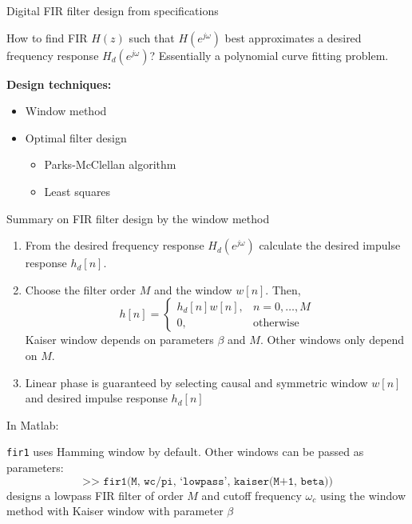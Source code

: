 \documentclass[10pt]{beamer}
\begin{document}
%
\begin{frame}{Digital FIR filter design from specifications}

How to find FIR $H(z)$ such that $H(e^{j\omega})$ best approximates a desired frequency response $H_d(e^{j\omega})$? Essentially a polynomial curve fitting problem.
\begin{center}
	\resizebox{0.6\linewidth}{!}{}
\end{center}

\textbf{Design techniques:}
\begin{itemize}
	\item Window method
	\item Optimal filter design
	\begin{itemize}
		\item Parks-McClellan algorithm
		\item Least squares
	\end{itemize}
\end{itemize}
\end{frame}

%
\begin{frame}{Summary on FIR filter design by the window method}
\begin{enumerate}
	\item From the desired frequency response $H_d(e^{j\omega})$ calculate the desired impulse response $h_d[n]$.
	\item Choose the filter order $M$ and the window $w[n]$. Then,
	\begin{equation*}
	h[n] = \begin{cases}
	h_d[n]w[n], & n = 0, \ldots, M \\
	0, &\text{otherwise}
	\end{cases}
	\end{equation*}
	Kaiser window depends on parameters $\beta$ and $M$. Other windows only depend on $M$.
	
	\item Linear phase is guaranteed by selecting causal and symmetric window $w[n]$ and desired impulse response $h_d[n]$
\end{enumerate}

In Matlab: 

\texttt{fir1} uses Hamming window by default. Other windows can be passed as parameters:
\begin{equation*}
\texttt{>> fir1(M, wc/pi, `lowpass', kaiser(M+1, beta))}
\end{equation*} 
designs a lowpass FIR filter of order $M$ and cutoff frequency $\omega_c$ using the window method with Kaiser window with parameter $\beta$
\end{frame}
\end{document}
